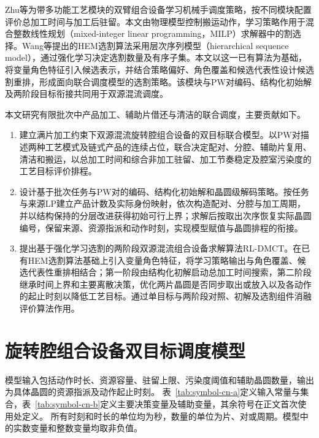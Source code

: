 \documentclass[preprint,12pt,nonatbib]{elsarticle}
\begin{document}
Zhu等为带多功能工艺模块的双臂组合设备学习机械手调度策略，按不同模块配置评价总加工时间与加工后驻留\citep{zhu2026multifunction}。本文由物理模型控制搬运动作，学习策略作用于混合整数线性规划（mixed-integer linear programming，MILP）求解器中的割选择\citep{tang2020cut,huang2022cutranking,paulus2022looking}。Wang等提出的HEM选割算法采用层次序列模型（hierarchical sequence model），通过强化学习决定选割数量及有序子集\citep{wang2023hem,wang2024hem}。本文以这一已有算法为基础，将变量角色特征引入候选表示，并结合策略偏好、角色覆盖和候选代表性设计候选割重排，形成面向联合调度模型的选割策略。该模块与PW对编码、结构化初始解及两阶段目标衔接共同用于双源混流调度。

本文研究有限批次中产品加工、辅助片借还与清洁的联合调度，主要贡献如下。
\begin{enumerate}[leftmargin=*]
\item 建立满片加工约束下双源混流旋转腔组合设备的双目标联合模型。以PW对描述两种工艺模式及链式产品的连续占位，联合决定配对、分腔、辅助片复用、清洁和搬运，以总加工时间和综合非加工驻留、加工节奏稳定及腔室污染度的工艺目标评价排程。
\item 设计基于批次任务与PW对的编码、结构化初始解和晶圆级解码策略。按任务与来源LP建立产品计数及实际身份映射，依次构造配对、分腔与加工周期，并以结构保持的分层改进获得初始可行上界；求解后按取出次序恢复实际晶圆编号，保留来源、资源指派和动作时刻，实现模型赋值与晶圆排程的衔接。
\item 提出基于强化学习选割的两阶段双源混流组合设备求解算法RL-DMCT。在已有HEM选割算法基础上引入变量角色特征，将学习策略输出与角色覆盖、候选代表性重排相结合；第一阶段由结构化初解启动总加工时间搜索，第二阶段继承时间上界和主要离散决策，优化两片晶圆是否同步取出或放入以及各动作的起止时刻以降低工艺目标。通过单目标与两阶段对照、初解及选割组件消融评价算法作用。
\end{enumerate}

\FloatBarrier
\section{旋转腔组合设备双目标调度模型}
\setcounter{equation}{0}

模型输入包括动作时长、资源容量、驻留上限、污染度阈值和辅助晶圆数量，输出为具体晶圆的资源指派及动作起止时刻。
表~\ref{tab:symbol-cn-a}定义输入常量与集合，表~\ref{tab:symbol-cn-b}定义主要决策变量及辅助变量，其余符号在正文首次使用处定义。
所有时刻和时长的单位均为秒，数量的单位为片、对或周期。模型中的实数变量和整数变量均取非负值。
\end{document}
